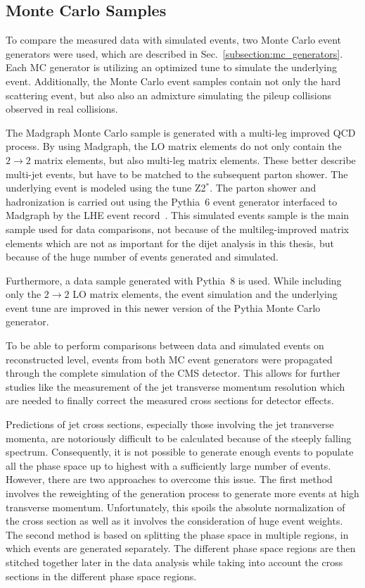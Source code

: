 \subsection{Monte Carlo Samples}

To compare the measured data with simulated events, two
Monte Carlo event generators were used, which are described in
Sec.~\ref{subsection:mc_generators}. Each MC generator is utilizing an optimized
tune to simulate the underlying event. Additionally, the Monte Carlo event samples
contain not only the hard scattering event, but also also an admixture
simulating the pileup collisions observed in real collisions.

The Madgraph Monte Carlo sample is generated with a multi-leg improved QCD
process. By using Madgraph, the LO matrix elements do not only contain the $2
\rightarrow 2$ matrix elements, but also multi-leg matrix elements. These better
describe multi-jet events, but have to be matched to the subsequent parton
shower. The underlying event is modeled using the tune Z2$^*$. The parton shower
and hadronization is carried out using the Pythia~6 event generator interfaced
to Madgraph by the LHE event record~\cite{Alwall:2006yp}. This simulated events
sample is the main sample used for data comparisons, not because of the
multileg-improved matrix elements which are not as important for the dijet
analysis in this thesis, but because of the huge number of events generated and simulated.

Furthermore, a data sample generated with Pythia~8 is used. While including only the $2
\rightarrow 2$ LO matrix elements, the event simulation and the underlying event
tune are improved in this newer version of the Pythia Monte Carlo generator.

To be able to perform comparisons between data and simulated events on
reconstructed level, events from both MC event generators were propagated
through the complete simulation of the CMS detector. This allows for further
studies like the measurement of the jet transverse momentum resolution which are
needed to finally correct the measured cross sections for detector effects.

Predictions of jet cross sections, especially those involving the jet transverse
momenta, are notoriously difficult to be calculated because of the steeply
falling spectrum. Consequently, it is not possible to generate enough events to
populate all the phase space up to highest \pt with a sufficiently large
number of events. However, there are two approaches to overcome this issue.
The first method involves the reweighting of the generation process to generate
more events at high transverse momentum. Unfortunately, this spoils the absolute
normalization of the cross section as well as it involves the consideration of
huge event weights. The second method is based on splitting the phase space in
multiple regions, in which events are generated separately. The different phase
space regions are then stitched together later in the data analysis while taking
into account the cross sections in the different phase space regions. 

